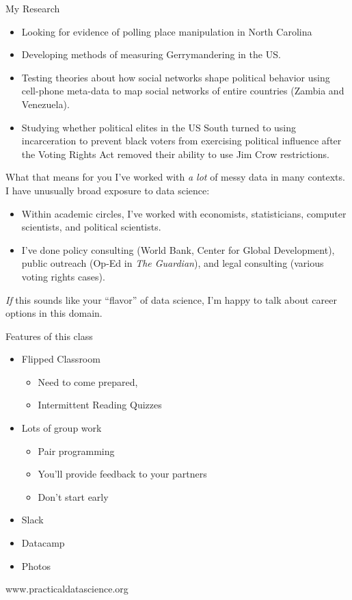 \documentclass[11pt]{beamer}
\begin{document}
\begin{frame}[c]{My Research}
	\begin{itemize}
		\pause \item Looking for evidence of polling place manipulation in North Carolina
		\pause \item Developing methods of measuring Gerrymandering in the US.
		\pause \item Testing theories about how social networks shape political behavior using cell-phone meta-data to map social networks of entire countries (Zambia and Venezuela).
		\pause \item Studying whether political elites in the US South turned to using incarceration to prevent black voters from exercising political influence after the Voting Rights Act removed their ability to use Jim Crow restrictions.
	\end{itemize}
\end{frame}

\begin{frame}[c]{What that means for you}
\pause I've worked with \emph{a lot} of messy data in many contexts. \\
\pause I have unusually broad exposure to data science:
\begin{itemize}
	\pause \item Within academic circles, I've worked with economists, statisticians, computer scientists, and political scientists.
	\pause \item I've done \alert{policy consulting} (World Bank, Center for Global Development), \alert{public outreach} (Op-Ed in \emph{The Guardian}), and \alert{legal consulting} (various voting rights cases).
\end{itemize}
\pause \emph{If} this sounds like your ``flavor'' of data science, I'm happy to talk about career options in this domain.
\end{frame}



\begin{frame}[c]{Features of this class}
\begin{itemize}
	\item Flipped Classroom
	\begin{itemize}
		\pause \item Need to come prepared,
		\pause \item Intermittent Reading Quizzes
	\end{itemize}
	\pause \item Lots of group work
	\begin{itemize}
		\pause \item Pair programming
		\pause \item You'll provide feedback to your partners
		\pause \item Don't start early
	\end{itemize}
	\pause \item Slack
	\pause \item Datacamp
	\pause \item Photos
\end{itemize}
\end{frame}


\begin{frame}[c]{}
	\begin{center}
www.practicaldatascience.org
	\end{center}
\end{frame}
\end{document}
